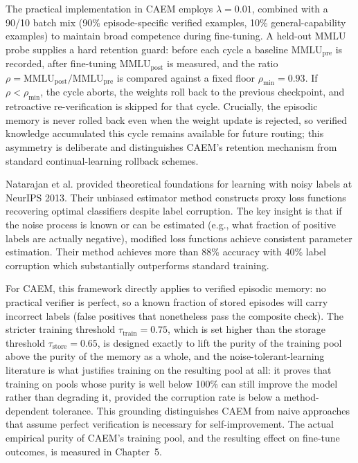 The practical implementation in CAEM employs $\lambda = 0.01$, combined with a 90/10 batch mix (90\% episode-specific verified examples, 10\% general-capability examples) to maintain broad competence during fine-tuning. A held-out MMLU probe supplies a hard retention guard: before each cycle a baseline $\text{MMLU}_{\text{pre}}$ is recorded, after fine-tuning $\text{MMLU}_{\text{post}}$ is measured, and the ratio $\rho = \text{MMLU}_{\text{post}} / \text{MMLU}_{\text{pre}}$ is compared against a fixed floor $\rho_{\min} = 0.93$. If $\rho < \rho_{\min}$, the cycle aborts, the weights roll back to the previous checkpoint, and retroactive re-verification is skipped for that cycle. Crucially, the episodic memory is never rolled back even when the weight update is rejected, so verified knowledge accumulated this cycle remains available for future routing; this asymmetry is deliberate and distinguishes CAEM's retention mechanism from standard continual-learning rollback schemes.

Natarajan et al. \cite{natarajan2013learning} provided theoretical foundations for learning with noisy labels at NeurIPS 2013. Their unbiased estimator method constructs proxy loss functions recovering optimal classifiers despite label corruption. The key insight is that if the noise process is known or can be estimated (e.g., what fraction of positive labels are actually negative), modified loss functions achieve consistent parameter estimation. Their method achieves more than 88\% accuracy with 40\% label corruption which substantially outperforms standard training. 

For CAEM, this framework directly applies to verified episodic memory: no practical verifier is perfect, so a known fraction of stored episodes will carry incorrect labels (false positives that nonetheless pass the composite check). The stricter training threshold $\tau_{\text{train}} = 0.75$, which is set higher than the storage threshold $\tau_{\text{store}} = 0.65$, is designed exactly to lift the purity of the training pool above the purity of the memory as a whole, and the noise-tolerant-learning literature is what justifies training on the resulting pool at all: it proves that training on pools whose purity is well below 100\% can still improve the model rather than degrading it, provided the corruption rate is below a method-dependent tolerance. This grounding distinguishes CAEM from naive approaches that assume perfect verification is necessary for self-improvement. The actual empirical purity of CAEM's training pool, and the resulting effect on fine-tune outcomes, is measured in Chapter~5.

